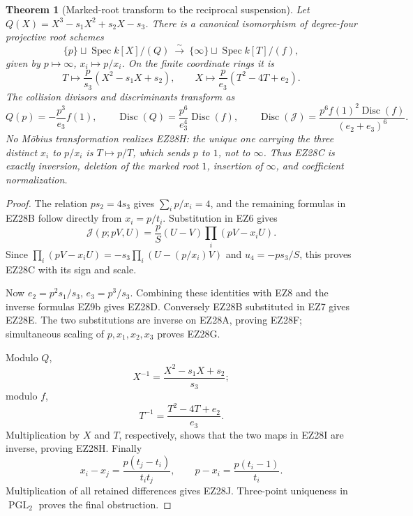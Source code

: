 \documentclass[11pt]{article}
\newtheorem{theorem}{Theorem}[section]
\theoremstyle{definition}\newtheorem{definition}[theorem]{Definition}
\theoremstyle{remark}\newtheorem{remark}[theorem]{Remark}
\newcommand{\Disc}{\operatorname{Disc}}
\begin{document}
\begin{theorem}[Marked-root transform to the reciprocal suspension]
Let \(Q(X)=X^3-s_1X^2+s_2X-s_3\).  There is a canonical isomorphism of
degree-four projective root schemes
\begin{equation}
 \{p\}\sqcup\operatorname{Spec}k[X]/(Q)
 \ \xrightarrow{\sim}\
 \{\infty\}\sqcup\operatorname{Spec}k[T]/(f),           \tag{EZ28H}
\end{equation}
given by \(p\mapsto\infty\), \(x_i\mapsto p/x_i\).  On the finite coordinate
rings it is
\begin{equation}
 T\longmapsto\frac p{s_3}(X^2-s_1X+s_2),\qquad
 X\longmapsto\frac p{e_3}(T^2-4T+e_2).                 \tag{EZ28I}
\end{equation}
The collision divisors and discriminants transform as
\begin{equation}
 Q(p)=-\frac{p^3}{e_3}f(1),\qquad
 \Disc(Q)=\frac{p^6}{e_3^4}\Disc(f),\qquad
 \Disc(\mathcal J)=
 \frac{p^6f(1)^2\Disc(f)}{(e_2+e_3)^6}.                \tag{EZ28J}
\end{equation}
No Möbius transformation realizes EZ28H: the unique one carrying the three
distinct \(x_i\) to \(p/x_i\) is \(T\mapsto p/T\), which sends \(p\) to \(1\),
not to \(\infty\).  Thus EZ28C is exactly inversion, deletion of the marked
root \(1\), insertion of \(\infty\), and coefficient normalization.
\end{theorem}

\begin{proof}
The relation \(ps_2=4s_3\) gives
\(\sum_i p/x_i=4\), and the remaining formulas in EZ28B follow directly from
\(x_i=p/t_i\).  Substitution in EZ6 gives
\[
 \mathcal J(p;pV,U)=\frac pS(U-V)\prod_i(pV-x_iU).
\]
Since
\(\prod_i(pV-x_iU)=-s_3\prod_i(U-(p/x_i)V)\) and
\(u_4=-ps_3/S\), this proves EZ28C with its sign and scale.

Now \(e_2=p^2s_1/s_3\), \(e_3=p^3/s_3\).  Combining these identities with
EZ8 and the inverse formulas EZ9b gives EZ28D.  Conversely EZ28B substituted
in EZ7 gives EZ28E.  The two substitutions are inverse on EZ28A, proving
EZ28F; simultaneous scaling of \(p,x_1,x_2,x_3\) proves EZ28G.

Modulo \(Q\),
\[
 X^{-1}=\frac{X^2-s_1X+s_2}{s_3};
\]
modulo \(f\),
\[
 T^{-1}=\frac{T^2-4T+e_2}{e_3}.
\]
Multiplication by \(X\) and \(T\), respectively, shows that the two maps in
EZ28I are inverse, proving EZ28H.  Finally
\[
 x_i-x_j=\frac{p(t_j-t_i)}{t_it_j},\qquad
 p-x_i=\frac{p(t_i-1)}{t_i}.
\]
Multiplication of all retained differences gives EZ28J.  Three-point
uniqueness in \(\operatorname{PGL}_2\) proves the final obstruction.
\end{proof}
\end{document}
